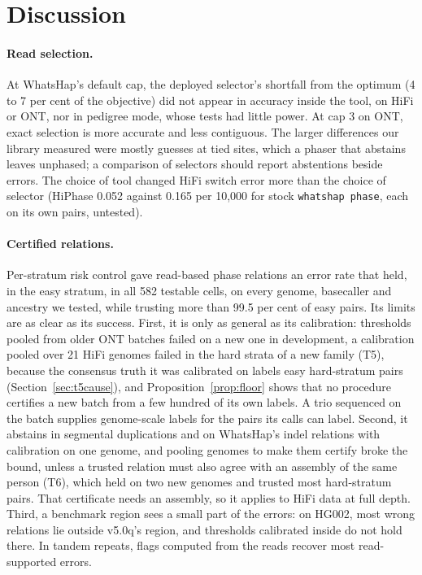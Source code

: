 \documentclass[11pt]{article}
\theoremstyle{definition}
\theoremstyle{remark}
\begin{document}
\section{Discussion}\label{sec:discussion}

\paragraph{Read selection.} At WhatsHap's default cap, the deployed
selector's shortfall from the optimum (4 to 7 per cent of the objective) did
not appear in accuracy inside the tool, on HiFi or ONT, nor in pedigree mode,
whose tests had little power. At cap 3 on ONT, exact selection is more
accurate and less contiguous. The larger differences our library measured
were mostly guesses at tied sites, which a phaser that abstains leaves
unphased; a comparison of selectors should report abstentions beside
errors. The choice of tool changed HiFi switch error more than the choice of
selector (HiPhase 0.052 against 0.165 per 10{,}000 for stock
\texttt{whatshap phase}, each on its own pairs, untested).

\paragraph{Certified relations.} Per-stratum risk control gave read-based
phase relations an error rate that held, in the easy stratum, in all 582
testable cells, on every genome, basecaller and ancestry we tested, while
trusting more than 99.5 per cent of easy pairs. Its limits are as clear as
its success. First, it is only as general as its calibration: thresholds
pooled from older ONT batches failed on a new one in development, a
calibration pooled over 21 HiFi genomes failed in the hard strata of a new
family (T5), because the consensus truth it was calibrated on labels easy
hard-stratum pairs (Section~\ref{sec:t5cause}), and Proposition~\ref{prop:floor} shows that no procedure
certifies a new batch from a few hundred of its own labels. A trio sequenced
on the batch supplies genome-scale labels for the pairs its calls can label.
Second, it abstains in segmental duplications and on WhatsHap's indel
relations with calibration on one genome, and pooling genomes to make them
certify broke the bound, unless a trusted relation must also agree with an
assembly of the same person (T6), which held on two new genomes and trusted
most hard-stratum pairs. That certificate needs an assembly, so it applies
to HiFi data at full depth. Third, a benchmark region sees a small part of the
errors: on HG002, most wrong relations lie outside v5.0q's region, and
thresholds calibrated inside do not hold there. In tandem repeats, flags
computed from the reads recover most read-supported errors.
\end{document}

